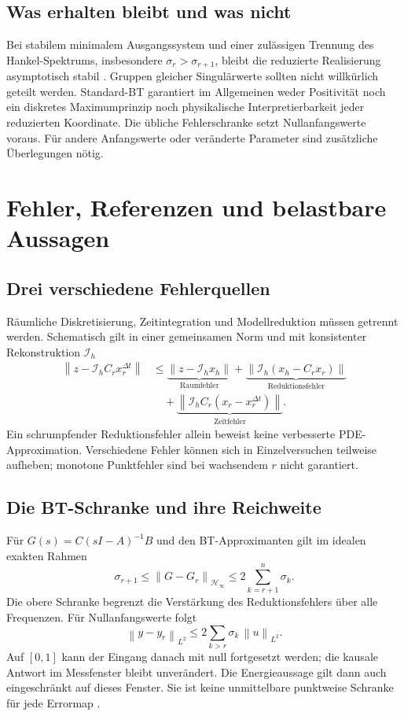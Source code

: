 \documentclass[11pt,a4paper]{article}
\newcommand{\norm}[1]{\left\lVert#1\right\rVert}
\newcommand{\Hinfty}{\mathcal{H}_\infty}
\begin{document}
\subsection{Was erhalten bleibt und was nicht}
Bei stabilem minimalem Ausgangssystem und einer zulässigen Trennung des Hankel-Spektrums, insbesondere $\sigma_r>\sigma_{r+1}$, bleibt die reduzierte Realisierung asymptotisch stabil \cite{lall}. Gruppen gleicher Singulärwerte sollten nicht willkürlich geteilt werden. Standard-BT garantiert im Allgemeinen weder Positivität noch ein diskretes Maximumprinzip noch physikalische Interpretierbarkeit jeder reduzierten Koordinate. Die übliche Fehlerschranke setzt Nullanfangswerte voraus. Für andere Anfangswerte oder veränderte Parameter sind zusätzliche Überlegungen nötig.

\section{Fehler, Referenzen und belastbare Aussagen}
\subsection{Drei verschiedene Fehlerquellen}
Räumliche Diskretisierung, Zeitintegration und Modellreduktion müssen getrennt werden. Schematisch gilt in einer gemeinsamen Norm und mit konsistenter Rekonstruktion $\mathcal I_h$
\begin{align}
 \norm{z-\mathcal I_h C_r x_r^{\Delta t}}
 &\le \underbrace{\norm{z-\mathcal I_h x_h}}_{\text{Raumfehler}}
 +\underbrace{\norm{\mathcal I_h(x_h-C_rx_r)}}_{\text{Reduktionsfehler}}\\
 &\quad+\underbrace{\norm{\mathcal I_h C_r(x_r-x_r^{\Delta t})}}_{\text{Zeitfehler}}.
\end{align}
Ein schrumpfender Reduktionsfehler allein beweist keine verbesserte PDE-Approximation. Verschiedene Fehler können sich in Einzelversuchen teilweise aufheben; monotone Punktfehler sind bei wachsendem $r$ nicht garantiert.

\subsection{Die BT-Schranke und ihre Reichweite}
Für $G(s)=C(sI-A)^{-1}B$ und den BT-Approximanten gilt im idealen exakten Rahmen
\begin{equation}\label{eq:btbound}
 \sigma_{r+1}\le\norm{G-G_r}_{\Hinfty}\le 2\sum_{k=r+1}^{n}\sigma_k.
\end{equation}
Die obere Schranke begrenzt die Verstärkung des Reduktionsfehlers über alle Frequenzen. Für Nullanfangswerte folgt
\begin{equation}
 \norm{y-y_r}_{L^2}\le 2\sum_{k>r}\sigma_k\,\norm{u}_{L^2}.
\end{equation}
Auf $[0,1]$ kann der Eingang danach mit null fortgesetzt werden; die kausale Antwort im Messfenster bleibt unverändert. Die Energieaussage gilt dann auch eingeschränkt auf dieses Fenster. Sie ist keine unmittelbare punktweise Schranke für jede Errormap \cite{lall,lower}.
\end{document}

